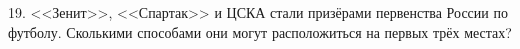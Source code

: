 19. <<Зенит>>, <<Спартак>> и ЦСКА стали призёрами первенства России по футболу. Сколькими способами они могут расположиться на первых трёх местах?\\
